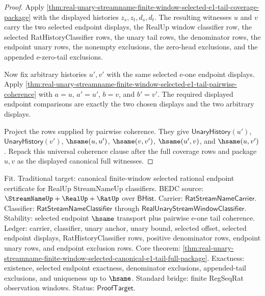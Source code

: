 \begin{proof}
Apply
\autoref{thm:real-unary-streamname-finite-window-selected-e1-tail-coverage-package}
with the displayed histories $z_s,z_t,d_s,d_t$. The resulting witnesses $u$ and
$v$ carry the two selected endpoint displays, the RealUp window classifier row,
the selected RatHistoryClassifier rows, the unary tail rows, the denominator
rows, the endpoint unary rows, the nonempty exclusions, the zero-head
exclusions, and the appended e-zero-tail exclusions.

Now fix arbitrary histories $u',v'$ with the same selected e-one endpoint
displays. Apply
\autoref{thm:real-unary-streamname-finite-window-selected-e1-tail-pairwise-coherence}
with $a=u$, $a'=u'$, $b=v$, and $b'=v'$. The required displayed endpoint
comparisons are exactly the two chosen displays and the two arbitrary displays.

Project the rows supplied by pairwise coherence. They give
$\mathsf{UnaryHistory}(u')$, $\mathsf{UnaryHistory}(v')$, $\hsame(u,u')$,
$\hsame(v,v')$, $\hsame(u',v)$, and $\hsame(u,v')$. Repack this universal
coherence clause after the full coverage rows and package $u,v$ as the displayed
canonical full witnesses.
\end{proof}

Fit. Traditional target: canonical finite-window selected rational endpoint
certificate for RealUp StreamNameUp classifiers. BEDC source:
$\StreamNameUp+\RealUp+\RatUp$ over $\mathsf{BHist}$. Carrier:
$\mathsf{RatStreamNameCarrier}$. Classifier:
$\mathsf{RatStreamNameClassifier}$ through
$\mathsf{RealUnaryStreamWindowClassifier}$. Stability: selected endpoint
$\hsame$ transport plus pairwise e-one tail coherence. Ledger: carrier,
classifier, unary anchor, unary bound, selected offset, selected endpoint
displays, RatHistoryClassifier rows, positive denominator rows, endpoint
unary rows, and endpoint exclusion rows. Core theorem:
\autoref{thm:real-unary-streamname-finite-window-selected-canonical-e1-tail-full-package}.
Exactness: existence, selected endpoint exactness, denominator exclusions,
appended-tail exclusions, and uniqueness up to $\hsame$. Standard bridge: finite
RegSeqRat observation windows. Status: $\mathsf{ProofTarget}$.

